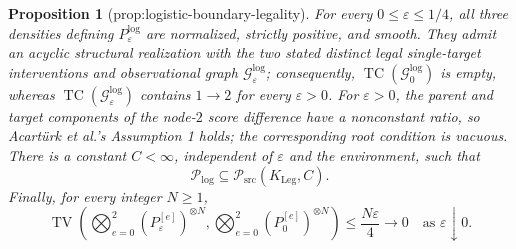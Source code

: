 \documentclass{article}
\newtheorem{proposition}{Proposition}
\begin{document}
\begin{proposition}[prop:logistic-boundary-legality]\label{prop:logistic-boundary-legality}
For every \(0\le\varepsilon\le1/4\), all three densities defining \(P_{\varepsilon}^{\mathrm{log}}\) are normalized, strictly positive, and smooth.  They admit an acyclic structural realization with the two stated distinct legal single-target interventions and observational graph \(\mathcal G_{\varepsilon}^{\mathrm{log}}\); consequently, \(\operatorname{TC}(\mathcal G_{0}^{\mathrm{log}})\) is empty, whereas \(\operatorname{TC}(\mathcal G_{\varepsilon}^{\mathrm{log}})\) contains \(1\to2\) for every \(\varepsilon>0\).  For \(\varepsilon>0\), the parent and target components of the node-\(2\) score difference have a nonconstant ratio, so Acartürk et al.'s Assumption 1 holds; the corresponding root condition is vacuous.  There is a constant \(C<\infty\), independent of \(\varepsilon\) and the environment, such that
\[
 \mathcal P_{\mathrm{log}}\subseteq
 \mathcal P_{\mathrm{src}}(K_{\mathrm{Leg}},C).
\]
Finally, for every integer \(N\ge1\),
\[
 \operatorname{TV}\!\left(
   \bigotimes_{e=0}^2(P_{\varepsilon}^{[e]})^{\otimes N},
   \bigotimes_{e=0}^2(P_{0}^{[e]})^{\otimes N}
 \right)
 \le \frac{N\varepsilon}{4}\longrightarrow0
 \quad\text{as }\varepsilon\downarrow0.
\]
\end{proposition}
\end{document}
